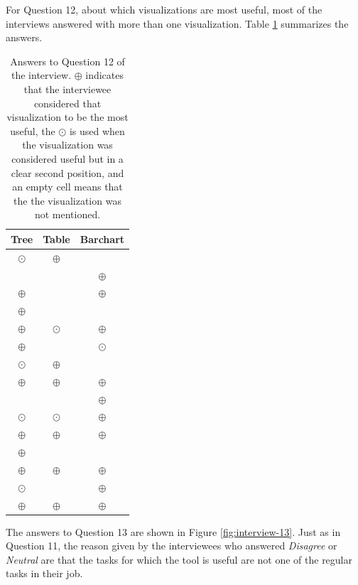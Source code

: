 For Question 12, about which visualizations are most useful, most of the interviews answered with more than one visualization. Table \ref{table:interview-12} summarizes the answers.

\begin{table}[ht!]
    \begin{center}
    \begin{tabular}{|c|c|c|}
    \hline
    Tree      & Table     & Barchart \\
    \hline\hline
    $\odot$   & $\oplus$  & ~        \\\hline
    ~	        & ~	        & $\oplus$ \\\hline
    $\oplus$  & ~         & $\oplus$ \\\hline
    $\oplus$	& ~         & ~        \\\hline
    $\oplus$	& $\odot$	  & $\oplus$ \\\hline
    $\oplus$	& ~         & $\odot$  \\\hline
    $\odot$	  & $\oplus$	& ~        \\\hline
    $\oplus$	& $\oplus$	& $\oplus$ \\\hline
    ~	        & ~	        & $\oplus$ \\\hline
    $\odot$	  & $\odot$	  & $\oplus$ \\\hline
    $\oplus$	& $\oplus$	& $\oplus$ \\\hline
    $\oplus$	& ~	        & ~        \\\hline
    $\oplus$	& $\oplus$	& $\oplus$ \\\hline
    $\odot$	  & ~	        & $\oplus$ \\\hline
    $\oplus$	& $\oplus$	& $\oplus$ \\\hline
    \end{tabular}
    \end{center}
    \caption{Answers to Question 12 of the interview. $\oplus$ indicates that the interviewee considered that visualization to be the most useful, the $\odot$ is used when the visualization was considered useful but in a clear second position, and an empty cell means that the the visualization was not mentioned.}
    \label{table:interview-12}
\end{table}

The answers to Question 13 are shown in Figure \ref{fig:interview-13}. Just as in Question 11, the reason given by the interviewees who answered \textit{Disagree} or \textit{Neutral} are that the tasks for which the tool is useful are not one of the regular tasks in their job.

